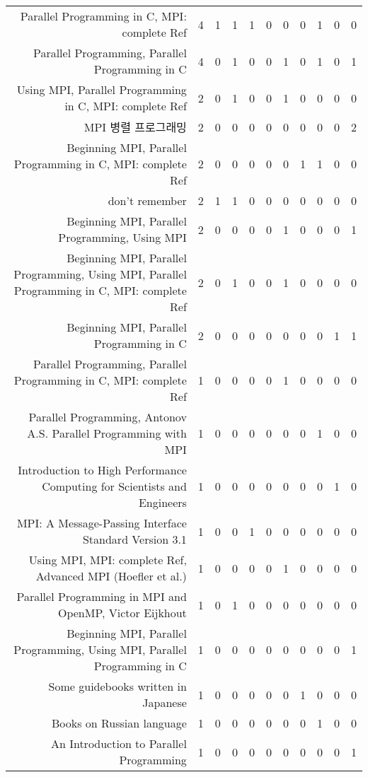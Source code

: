 {\begin{landscape}
\begin{longtable}[htb]{r|c|c|c|c|c|c|c|c|c|c}
{Parallel Programming in C, MPI: complete Ref} & 4 & 1 & 1 & 1 & 0 & 0 & 0 & 1 & 0 & 0 \\%
{Parallel Programming, Parallel Programming in C} & 4 & 0 & 1 & 0 & 0 & 1 & 0 & 1 & 0 & 1 \\%
{Using MPI, Parallel Programming in C, MPI: complete Ref} & 2 & 0 & 1 & 0 & 0 & 1 & 0 & 0 & 0 & 0 \\%
{MPI 병렬 프로그래밍} & 2 & 0 & 0 & 0 & 0 & 0 & 0 & 0 & 0 & 2 \\%
{Beginning MPI, Parallel Programming in C, MPI: complete Ref} & 2 & 0 & 0 & 0 & 0 & 0 & 1 & 1 & 0 & 0 \\%
{don't remember} & 2 & 1 & 1 & 0 & 0 & 0 & 0 & 0 & 0 & 0 \\%
{Beginning MPI, Parallel Programming, Using MPI} & 2 & 0 & 0 & 0 & 0 & 1 & 0 & 0 & 0 & 1 \\%
{Beginning MPI, Parallel Programming, Using MPI, Parallel Programming in C, MPI: complete Ref} & 2 & 0 & 1 & 0 & 0 & 1 & 0 & 0 & 0 & 0 \\%
{Beginning MPI, Parallel Programming in C} & 2 & 0 & 0 & 0 & 0 & 0 & 0 & 0 & 1 & 1 \\%
{Parallel Programming, Parallel Programming in C, MPI: complete Ref} & 1 & 0 & 0 & 0 & 0 & 1 & 0 & 0 & 0 & 0 \\%
{Parallel Programming, Antonov A.S. Parallel Programming with MPI} & 1 & 0 & 0 & 0 & 0 & 0 & 0 & 1 & 0 & 0 \\%
{Introduction to High Performance Computing for Scientists and Engineers} & 1 & 0 & 0 & 0 & 0 & 0 & 0 & 0 & 1 & 0 \\%
{MPI: A Message-Passing Interface Standard Version 3.1} & 1 & 0 & 0 & 1 & 0 & 0 & 0 & 0 & 0 & 0 \\%
{Using MPI, MPI: complete Ref, Advanced MPI (Hoefler et al.)} & 1 & 0 & 0 & 0 & 0 & 1 & 0 & 0 & 0 & 0 \\%
{Parallel Programming in MPI and OpenMP, Victor Eijkhout} & 1 & 0 & 1 & 0 & 0 & 0 & 0 & 0 & 0 & 0 \\%
{Beginning MPI, Parallel Programming, Using MPI, Parallel Programming in C} & 1 & 0 & 0 & 0 & 0 & 0 & 0 & 0 & 0 & 1 \\%
{Some guidebooks written in Japanese} & 1 & 0 & 0 & 0 & 0 & 0 & 1 & 0 & 0 & 0 \\%
{Books on Russian language} & 1 & 0 & 0 & 0 & 0 & 0 & 0 & 1 & 0 & 0 \\%
{An Introduction to Parallel Programming} & 1 & 0 & 0 & 0 & 0 & 0 & 0 & 0 & 0 & 1 \\%

\end{longtable}
\end{landscape}}
